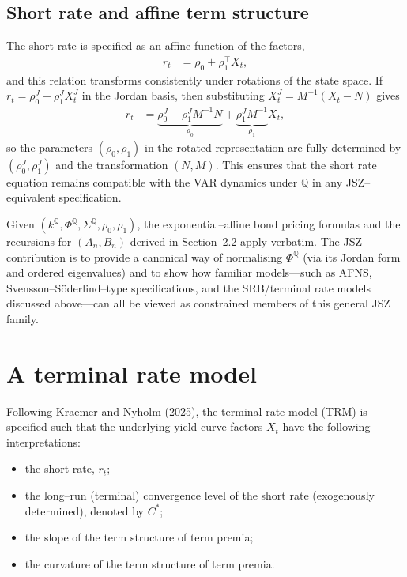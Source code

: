 \documentclass[
  letterpaper,
  DIV=11,
  numbers=noendperiod]{scrreprt}
\providecommand{\tightlist}{%
  \setlength{\itemsep}{0pt}\setlength{\parskip}{0pt}}
\begin{document}
\subsection*{Short rate and affine term
structure}\label{short-rate-and-affine-term-structure}

The short rate is specified as an affine function of the factors,
\begin{align}
r_t &= \rho_0 + \rho_1^{\top} X_t,
\end{align}
and this relation transforms consistently under rotations of the state
space. If \(r_t = \rho_0^{J} + \rho_1^{J} X_t^{J}\) in the Jordan basis,
then substituting \(X_t^{J} = M^{-1}(X_t - N)\) gives
\begin{align}
r_t
&= \underbrace{\rho_0^{J} - \rho_1^{J} M^{-1} N}_{\rho_0}
  + \underbrace{\rho_1^{J} M^{-1}}_{\rho_1} X_t,
\end{align}
so the parameters \((\rho_0,\rho_1)\) in the rotated representation are
fully determined by \((\rho_0^{J},\rho_1^{J})\) and the transformation
\((N,M)\). This ensures that the short rate equation remains compatible
with the VAR dynamics under \(\mathbb{Q}\) in any JSZ--equivalent
specification.

Given
\((k^{\mathbb{Q}},\Phi^{\mathbb{Q}},\Sigma^{\mathbb{Q}},\rho_0,\rho_1)\),
the exponential--affine bond pricing formulas and the recursions for
\((A_n,B_n)\) derived in Section~2.2 apply verbatim. The JSZ
contribution is to provide a canonical way of normalising
\(\Phi^{\mathbb{Q}}\) (via its Jordan form and ordered eigenvalues) and
to show how familiar models---such as AFNS, Svensson--Söderlind--type
specifications, and the SRB/terminal rate models discussed above---can
all be viewed as constrained members of this general JSZ family.

\section{A terminal rate model}\label{a-terminal-rate-model}

Following Kraemer and Nyholm (2025), the terminal rate model (TRM) is
specified such that the underlying yield curve factors \(X_t\) have the
following interpretations:

\begin{itemize}
\tightlist
\item
  the short rate, \(r_t\);
\item
  the long--run (terminal) convergence level of the short rate
  (exogenously determined), denoted by \(C^{*}\);
\item
  the slope of the term structure of term premia;
\item
  the curvature of the term structure of term premia.
\end{itemize}
\end{document}
